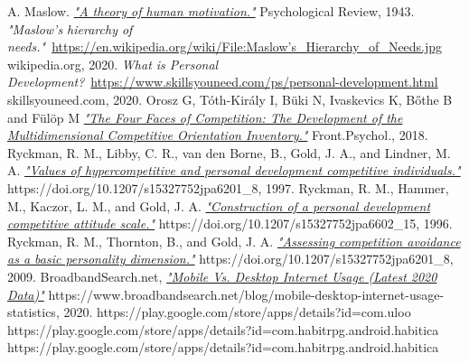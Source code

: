 \documentclass[twoside]{ctuthesis}
\begin{document}
    \maketitle
    
    
    
    
    
    
    
    

    
    \begin{thebibliography}{99}
         A. Maslow. \href{http://psychclassics.yorku.ca/Maslow/motivation.htm}{\emph{"A theory of human motivation."}} Psychological Review, 1943.
         \emph{"Maslow's hierarchy of needs."}~\href{https://en.wikipedia.org/wiki/File:Maslow's_Hierarchy_of_Needs.jpg}{https://en.wikipedia.org/wiki/File:Maslow's\_Hierarchy\_of\_Needs.jpg} wikipedia.org, 2020.
         \emph{What is Personal Development?}~\href{https://www.skillsyouneed.com/ps/personal-development.html}{https://www.skillsyouneed.com/ps/personal-development.html} skillsyouneed.com, 2020.
         Orosz G, Tóth-Király I, Büki N, Ivaskevics K, Bőthe B and Fülöp M \href{https://www.frontiersin.org/articles/10.3389/fpsyg.2018.00779/full}{\emph{"The Four Faces of Competition: The Development of the Multidimensional Competitive Orientation Inventory."}} Front.Psychol., 2018.
         Ryckman, R. M., Libby, C. R., van den Borne, B., Gold, J. A., and Lindner, M. A. \href{https://doi.org/10.1207/s15327752jpa6201_8}{\emph{"Values of hypercompetitive and personal development competitive individuals."}} https://doi.org/10.1207/s15327752jpa6201\_8, 1997.
         Ryckman, R. M., Hammer, M., Kaczor, L. M., and Gold, J. A. \href{https://doi.org/10.1207/s15327752jpa6602_15}{\emph{"Construction of a personal development competitive attitude scale."}} https://doi.org/10.1207/s15327752jpa6602\_15, 1996.
         Ryckman, R. M., Thornton, B., and Gold, J. A. \href{https://doi.org/10.1207/s15327752jpa6201_8}{\emph{"Assessing competition avoidance as a basic personality dimension."}} https://doi.org/10.1207/s15327752jpa6201\_8, 2009.
         BroadbandSearch.net, \href{https://www.broadbandsearch.net/blog/mobile-desktop-internet-usage-statistics}{\emph{"Mobile Vs. Desktop Internet Usage (Latest 2020 Data)"}} https://www.broadbandsearch.net/blog/mobile-desktop-internet-usage-statistics, 2020.
         https://play.google.com/store/apps/details?id=com.uloo
         https://play.google.com/store/apps/details?id=com.habitrpg.android.habitica
         https://play.google.com/store/apps/details?id=com.habitrpg.android.habitica
    \end{thebibliography}
\end{document}
